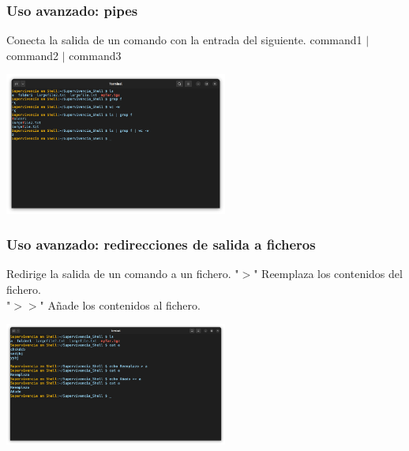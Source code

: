 \documentclass[10pt]{beamer}
\begin{document}
	\begin{frame}
		\frametitle{Uso avanzado: pipes}
		\begin{alertblock}{Conecta la salida de un comando con la entrada del siguiente.}
			command1 $|$ command2 $|$ command3 
		\end{alertblock}
		\begin{center}
			\includegraphics[width=0.55\textwidth]{pipes}
		\end{center}
	\end{frame}
	
	\begin{frame}
		\frametitle{Uso avanzado: redirecciones de salida a ficheros}
		\begin{alertblock}{Redirige la salida de un comando a un fichero.}
			"$>$" Reemplaza los contenidos del fichero.\\
			"$>>$" Añade los contenidos al fichero.
		\end{alertblock}
		\begin{center}
			\includegraphics[width=0.55\textwidth]{redir}
		\end{center}
	\end{frame}	
\end{document}
